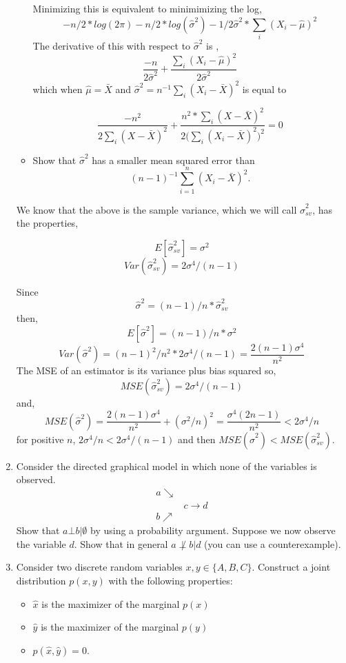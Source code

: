 \documentclass{article}
\begin{document}
\begin{enumerate}
\begin{itemize}
Minimizing this is equivalent to minimimizing the log,
$$
-n/2 * log(2\pi) -n/2 *log(\hat\sigma^2) - 1/2 \hat\sigma^2 * \sum_i (X_i - \hat\mu)^2
$$
The derivative of this with respect to $\hat\sigma^2$ is ,
$$\frac{-n}{2\hat\sigma^2} + \frac{\sum_i (X_i - \hat\mu)^2}{2 \hat\sigma^2}$$
which when $\hat\mu = \bar{X}$ and 
$\hat\sigma^2 = n^{-1} \sum_i (X_i - \bar{X})^2$ is equal to 


$$
\frac{-n^2}{2 \sum_i (X - \bar{X})^2} + \frac{n^2 * \sum_i (X- \bar{X})^2}{2 \big(\sum_i (X_i - \bar {X})^2 \big)^2} = 0
$$

\color{black}


\item Show that ${\hat\sigma}^2$ has a smaller mean squared error than 
$$(n-1)^{-1} \sum_{i=1}^n (X_i - \bar X)^2.$$
\end{itemize}
\color{blue}
We know that the above is the sample variance, which we will call $\hat\sigma_{sv}^2$,
has the properties,

$$E[\hat\sigma^2_{sv}] = \sigma^2$$
$$Var(\hat\sigma^2_{sv}) =  2\sigma^4/(n-1)$$

Since $$\hat\sigma ^2 = (n-1)/n * \hat\sigma^2_{sv}$$
then,
$$
E[\hat\sigma^2] = (n-1)/n * \sigma^2
$$
$$
Var(\hat\sigma^2) = (n-1)^2/n^2 * 2\sigma^4/(n-1) = \frac{2(n-1)\sigma^4}{n^2}
$$
The MSE of an estimator is its variance plus bias squared so,
$$
MSE(\hat\sigma^2_{sv}) = 2\sigma^4/(n-1)
$$
and,
$$
MSE(\hat\sigma^2) = \frac{2(n-1)\sigma^4}{n^2} + (\sigma^2/n)^2 = \frac{\sigma^4 (2n-1)}{n^2} < 2\sigma^4 / n
$$
for positive $n$, $2\sigma^4/n < 2\sigma^4 / (n-1)$
and then
$MSE(\hat\sigma^2) < MSE(\hat\sigma^2_{sv})$.  

\color{black}

\item
Consider the directed graphical model in which none of the variables is observed.  
$$
\begin{array}{cc}
a \searrow &  \\
& c \rightarrow d \\
b \nearrow &
\end{array}
$$
Show that $a \bot b \vert \emptyset$ by using a probability argument.
Suppose we now observe the variable $d$.  Show that in general $a \not\perp b \vert d$ (you can use a counterexample).

\item
Consider two discrete random variables $x,y \in \{A,B,C\}$.
Construct a joint distribution $p(x,y)$ with the following properties:
\begin{itemize}
\item $\hat x$ is the maximizer of the marginal $p(x)$
\item $\hat y$ is the maximizer of the marginal $p(y)$
\item $p(\hat x, \hat y)=0$.
\end{itemize}


\end{enumerate}
\end{document}
